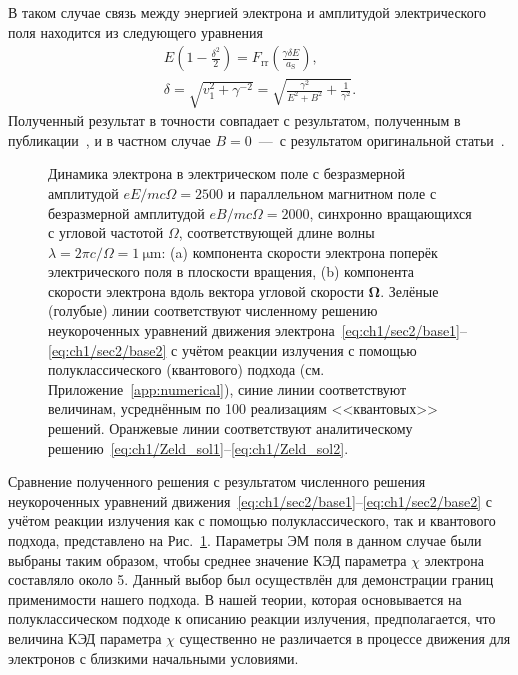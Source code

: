 В таком случае связь между энергией электрона и амплитудой электрического поля находится из следующего уравнения
\begin{gather}
    E \left(1 - \frac{\delta^2}{2}\right) = F_\mathrm{rr}\left(\frac{\gamma\delta E}{a_\mathrm{S}}\right) , \\
    \delta = \sqrt{v_1^2 + \gamma^{-2}} = \sqrt{\frac{\gamma^2}{E^2 + B^2} + \frac{1}{\gamma^2}}.
\end{gather}
Полученный результат в точности совпадает с результатом, полученным в публикации~\cite{Kostyukov2016}, и в частном случае $B=0$~---~с результатом оригинальной статьи~\cite{Zeldovich75}.
\begin{figure}[ht]
    \caption[Динамика электрона в синхронно вращающихся однородных параллельных электрическом и магнитном полях]{
    Динамика электрона в электрическом поле с безразмерной амплитудой $eE/mc\Omega = \num{2500}$ и параллельном магнитном поле с безразмерной амплитудой $eB/mc\Omega = \num{2000}$, синхронно вращающихся с угловой частотой $\Omega$, соответствующей длине волны $\lambda = 2\pi c /\Omega = \SI{1}{\um}$: (a) компонента скорости электрона поперёк электрического поля в плоскости вращения, (b) компонента скорости электрона вдоль вектора угловой скорости $\symbf{\Omega}$. Зелёные (голубые) линии соответствуют численному решению неукороченных уравнений движения электрона~\eqref{eq:ch1/sec2/base1}--\eqref{eq:ch1/sec2/base2} с учётом реакции излучения с помощью полуклассического (квантового) подхода (см. Приложение~\ref{app:numerical}), синие линии соответствуют величинам, усреднённым по 100 реализациям <<квантовых>> решений. Оранжевые линии соответствуют аналитическому решению~\eqref{eq:ch1/Zeld_sol1}--\eqref{eq:ch1/Zeld_sol2}.}
    \label{fig:ch1/sec5/zeldovich}
\end{figure}
Сравнение полученного решения с результатом численного решения неукороченных уравнений движения~\eqref{eq:ch1/sec2/base1}--\eqref{eq:ch1/sec2/base2} с учётом реакции излучения как с помощью полуклассического, так и квантового подхода, представлено на Рис.~\ref{fig:ch1/sec5/zeldovich}.
Параметры ЭМ поля в данном случае были выбраны таким образом, чтобы среднее значение КЭД параметра $\chi$ электрона составляло около 5.
Данный выбор был осуществлён для демонстрации границ применимости нашего подхода.
В нашей теории, которая основывается на полуклассическом подходе к описанию реакции излучения, предполагается, что величина КЭД параметра $\chi$ существенно не различается в процессе движения для электронов с близкими начальными условиями.
